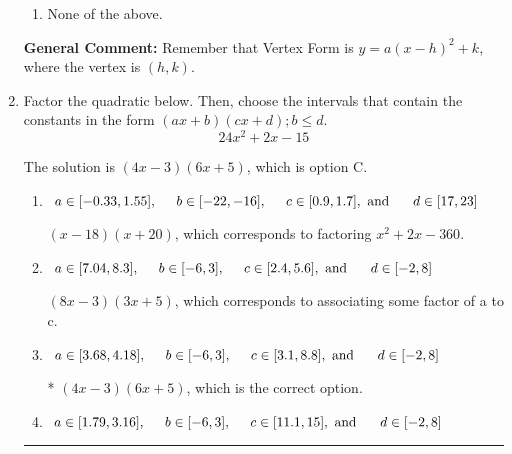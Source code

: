 \documentclass{extbook}[14pt]
\newcommand{\litem}[1]{\item #1

\rule{\textwidth}{0.4pt}}
\begin{document}
\begin{enumerate}
{\begin{enumerate}[label=\Alph*.]
\item None of the above.\end{enumerate}
\textbf{General Comment:} Remember that Vertex Form is $y = a(x-h)^2+k$, where the vertex is $(h, k)$.
}
\litem{
Factor the quadratic below. Then, choose the intervals that contain the constants in the form $(ax+b)(cx+d); b \leq d.$
\[ 24x^{2} +2 x -15 \]

The solution is \( (4x -3)(6x + 5) \), which is option C.\begin{enumerate}[label=\Alph*.]
\item \( a \in [-0.33, 1.55], \hspace*{5mm} b \in [-22, -16], \hspace*{5mm} c \in [0.9, 1.7], \text{ and } \hspace*{5mm} d \in [17, 23] \)

 $(x -18)(x + 20)$, which corresponds to factoring $x^{2} +2 x -360$.
\item \( a \in [7.04, 8.3], \hspace*{5mm} b \in [-6, 3], \hspace*{5mm} c \in [2.4, 5.6], \text{ and } \hspace*{5mm} d \in [-2, 8] \)

 $(8x -3)(3x + 5)$, which corresponds to associating some factor of a to c.
\item \( a \in [3.68, 4.18], \hspace*{5mm} b \in [-6, 3], \hspace*{5mm} c \in [3.1, 8.8], \text{ and } \hspace*{5mm} d \in [-2, 8] \)

* $(4x -3)(6x + 5)$, which is the correct option.
\item \( a \in [1.79, 3.16], \hspace*{5mm} b \in [-6, 3], \hspace*{5mm} c \in [11.1, 15], \text{ and } \hspace*{5mm} d \in [-2, 8] \)


\end{enumerate}}
\end{enumerate}
\end{document}
